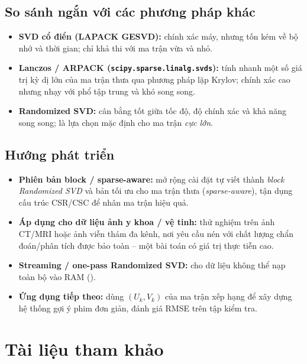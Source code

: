 \subsection{So sánh ngắn với các phương pháp khác}

\begin{itemize}
    \item \textbf{SVD cổ điển (LAPACK GESVD):} chính xác máy, nhưng tốn kém về
    bộ nhớ và thời gian; chỉ khả thi với ma trận vừa và nhỏ.
    \item \textbf{Lanczos / ARPACK (\texttt{scipy.sparse.linalg.svds}):} tính
    nhanh một số giá trị kỳ dị lớn của ma trận thưa qua phương pháp lặp
    Krylov; chính xác cao nhưng nhạy với phổ tập trung và khó song song.
    \item \textbf{Randomized SVD:} cân bằng tốt giữa tốc độ, độ chính xác và
    khả năng song song; là lựa chọn mặc định cho ma trận \emph{cực lớn}.
\end{itemize}

\subsection{Hướng phát triển}

\begin{itemize}
    \item \textbf{Phiên bản block / sparse-aware:} mở rộng cài đặt tự viết
    thành \emph{block Randomized SVD} và bản tối ưu cho ma trận thưa
    (\emph{sparse-aware}), tận dụng cấu trúc CSR/CSC để nhân ma trận hiệu quả.
    \item \textbf{Áp dụng cho dữ liệu ảnh y khoa / vệ tinh:} thử nghiệm trên
    ảnh CT/MRI hoặc ảnh viễn thám đa kênh, nơi yêu cầu nén với chất lượng
    chẩn đoán/phân tích được bảo toàn -- một bài toán có giá trị thực tiễn cao.
    \item \textbf{Streaming / one-pass Randomized SVD:} cho dữ liệu không thể
    nạp toàn bộ vào RAM (\cite{tropp2017practical}).
    \item \textbf{Ứng dụng tiếp theo:} dùng $(U_k, V_k)$ của ma trận xếp hạng
    để xây dựng hệ thống gợi ý phim đơn giản, đánh giá RMSE trên tập kiểm tra.
\end{itemize}


\section{Tài liệu tham khảo}

